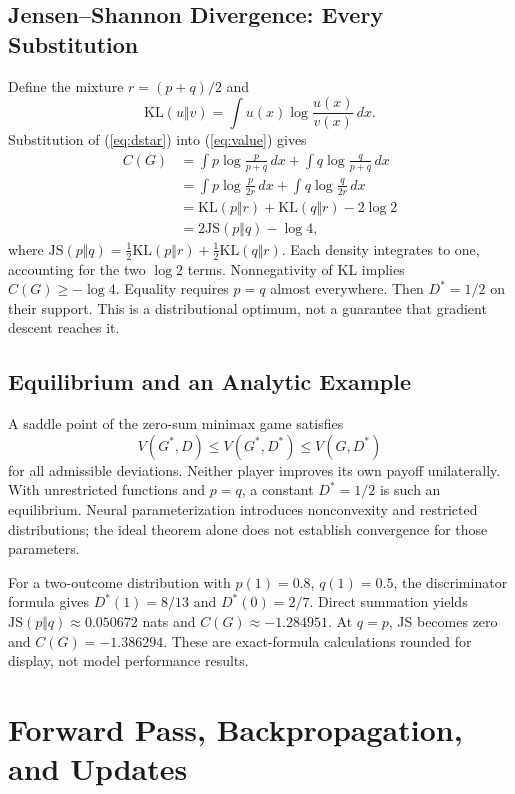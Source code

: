 \documentclass[conference]{IEEEtran}
\begin{document}
\subsection{Jensen--Shannon Divergence: Every Substitution}
Define the mixture $r=(p+q)/2$ and
\begin{equation}
\mathrm{KL}(u\Vert v)=\int u(x)\log\frac{u(x)}{v(x)}\,dx.
\end{equation}
Substitution of (\ref{eq:dstar}) into (\ref{eq:value}) gives
\begin{align}
C(G)&=\int p\log\frac{p}{p+q}\,dx+\int q\log\frac{q}{p+q}\,dx\\
&=\int p\log\frac{p}{2r}\,dx+\int q\log\frac{q}{2r}\,dx\\
&=\mathrm{KL}(p\Vert r)+\mathrm{KL}(q\Vert r)-2\log2\\
&=2\mathrm{JS}(p\Vert q)-\log4,\label{eq:js}
\end{align}
where $\mathrm{JS}(p\Vert q)=\tfrac12\mathrm{KL}(p\Vert r)+\tfrac12\mathrm{KL}(q\Vert r)$. Each density integrates to one, accounting for the two $\log2$ terms. Nonnegativity of KL implies $C(G)\geq-\log4$. Equality requires $p=q$ almost everywhere. Then $D^*=1/2$ on their support. This is a distributional optimum, not a guarantee that gradient descent reaches it.

\subsection{Equilibrium and an Analytic Example}
A saddle point of the zero-sum minimax game satisfies
\begin{equation}
V(G^*,D)\leq V(G^*,D^*)\leq V(G,D^*)
\end{equation}
for all admissible deviations. Neither player improves its own payoff unilaterally. With unrestricted functions and $p=q$, a constant $D^*=1/2$ is such an equilibrium. Neural parameterization introduces nonconvexity and restricted distributions; the ideal theorem alone does not establish convergence for those parameters.

For a two-outcome distribution with $p(1)=0.8$, $q(1)=0.5$, the discriminator formula gives $D^*(1)=8/13$ and $D^*(0)=2/7$. Direct summation yields $\mathrm{JS}(p\Vert q)\approx0.050672$ nats and $C(G)\approx-1.284951$. At $q=p$, JS becomes zero and $C(G)=-1.386294$. These are exact-formula calculations rounded for display, not model performance results.

\section{Forward Pass, Backpropagation, and Updates}
\end{document}
